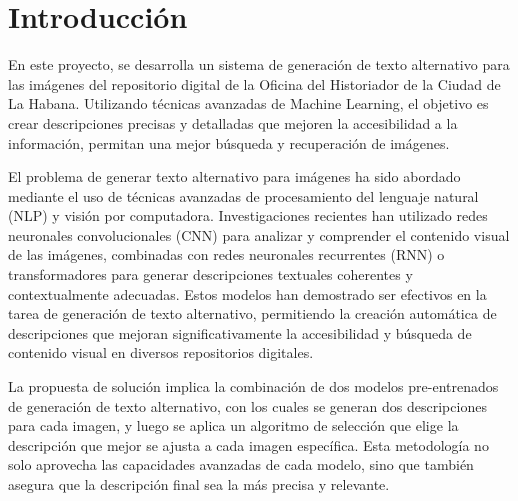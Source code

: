 \chapter{Introducción}\label{chapter:introduction}
En este proyecto, se desarrolla un sistema de generación de texto alternativo para las imágenes del repositorio digital de la Oficina del Historiador de la Ciudad de La Habana. Utilizando técnicas avanzadas de Machine Learning, el objetivo es crear descripciones precisas y detalladas que mejoren la accesibilidad a la información, permitan una mejor búsqueda y recuperación de imágenes. 

El problema de generar texto alternativo para imágenes ha sido abordado mediante el uso de técnicas avanzadas de procesamiento del lenguaje natural (NLP) y visión por computadora. Investigaciones recientes han utilizado redes neuronales convolucionales (CNN) para analizar y comprender el contenido visual de las imágenes, combinadas con redes neuronales recurrentes (RNN) o transformadores para generar descripciones textuales coherentes y contextualmente adecuadas. Estos modelos han demostrado ser efectivos en la tarea de generación de texto alternativo, permitiendo la creación automática de descripciones que mejoran significativamente la accesibilidad y búsqueda de contenido visual en diversos repositorios digitales.

La propuesta de solución implica la combinación de dos modelos pre-entrenados de generación de texto alternativo, con los cuales se generan dos descripciones para cada imagen, y luego se aplica un algoritmo de selección que elige la descripción que mejor se ajusta a cada imagen específica. Esta metodología no solo aprovecha las capacidades avanzadas de cada modelo, sino que también asegura que la descripción final sea la más precisa y relevante.